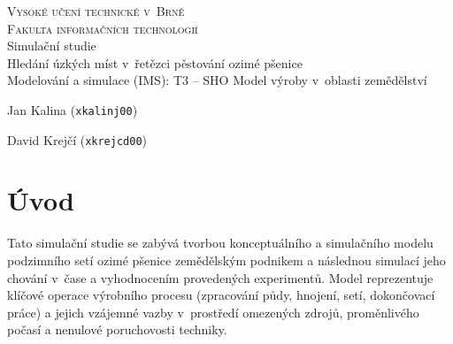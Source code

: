\documentclass[11pt,a4paper]{article}
\begin{document}

\begin{titlepage}
\begin{center}
    \Huge{\textsc{Vysoké učení technické v~Brně}}\\
    \vspace{0.5em}
    \huge{\textsc{Fakulta informačních technologií}}\\
    {{\Huge Simulační studie\\}
     \vspace{0.6em}
     {\huge Hledání úzkých míst v~řetězci pěstování ozimé pšenice\\}
     \vspace{0.3em}
     {\Large Modelování a simulace (IMS): T3 -- SHO Model výroby v~oblasti zemědělství\\}}
\end{center}
\begin{flushright}
Jan Kalina (\texttt{xkalinj00})
\end{flushright}
\vspace{-0.5\baselineskip}
\hfill
David Krejčí (\texttt{xkrejcd00})
\end{titlepage}

\newpage



{
    \hypersetup{linkcolor=black}
    \tableofcontents
}

\newpage



\section{Úvod}

Tato simulační studie se zabývá tvorbou konceptuálního a simulačního modelu podzimního setí ozimé pšenice zemědělským podnikem a následnou simulací jeho chování v~čase a vyhodnocením provedených experimentů. Model reprezentuje klíčové operace výrobního procesu (zpracování půdy, hnojení, setí, dokončovací práce) a jejich vzájemné vazby v~prostředí omezených zdrojů, proměnlivého počasí a nenulové poruchovosti techniky.
\end{document}
